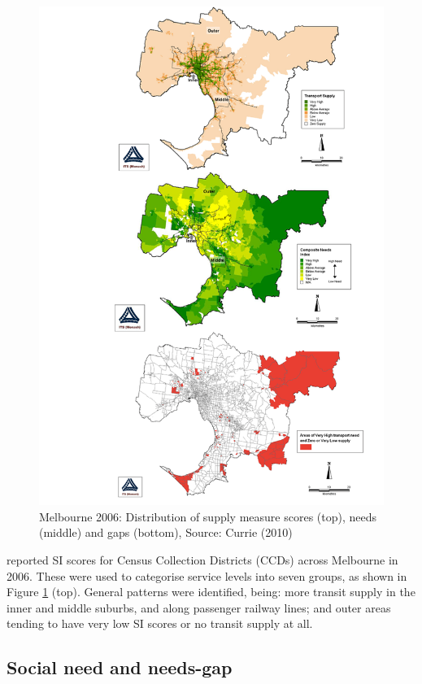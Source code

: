 \documentclass[preprint, 3p,
authoryear]{elsarticle} %
\begin{document}
\begin{figure}
\includegraphics[width=0.9\linewidth]{graphics/Currie2010combined1} \caption{Melbourne 2006: Distribution of supply measure scores (top), needs (middle) and gaps (bottom), Source: Currie (2010)}\label{fig:Currie_map_SI}
\end{figure}

\citet{currie2010identifying} reported SI scores for Census Collection
Districts (CCDs) across Melbourne in 2006. These were used to categorise
service levels into seven groups, as shown in Figure
\ref{fig:Currie_map_SI} (top). General patterns were identified, being:
more transit supply in the inner and middle suburbs, and along passenger
railway lines; and outer areas tending to have very low SI scores or no
transit supply at all.

\hypertarget{social-need-and-needs-gap}{%
\subsection{Social need and needs-gap}\label{social-need-and-needs-gap}}
\end{document}
